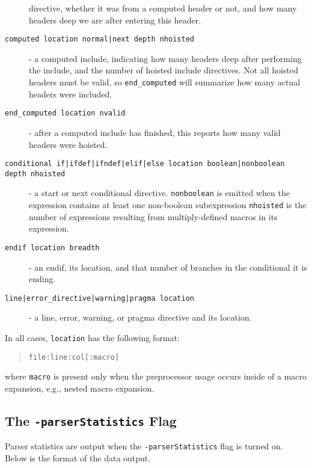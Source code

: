 \documentclass{article}
\begin{document}
\begin{description}
  directive, whether it was from a computed header or not, and how
  many headers deep we are after entering this header.
\item[\texttt{computed location normal|next depth nhoisted}] - a computed
  include, indicating how many headers deep after performing the
  include, and the number of hoisted include directives.  Not all
  hoisted headers must be valid, so \verb"end_computed" will summarize how
  many actual headers were included.
\item[\texttt{end\_computed location nvalid}] - after a computed include has
  finished, this reports how many valid headers were hoisted.
\item[\texttt{conditional if|ifdef|ifndef|elif|else location
  boolean|nonboolean depth nhoisted}] - a start or next conditional
  directive. \verb"nonboolean" is emitted when the expression contains at
  least one non-boolean subexpression \verb"nhoisted" is the number of
  expressions resulting from multiply-defined macros in its
  expression.
\item[\texttt{endif location breadth}] - an endif, its location, and that
  number of branches in the conditional it is ending.
\item[\texttt{line|error\_directive|warning|pragma location}] - a line, error, warning,
  or pragma directive and its location.
\end{description}

In all cases, \verb"location" has the following format:

\begin{quote}
\verb"file:line:col[:macro]"
\end{quote}

where \verb"macro" is present only when the preprocessor usage occurs
inside of a macro expansion, e.g., nested macro expansion.

\subsection{The \texttt{-parserStatistics} Flag}

Parser statistics are output when the \verb"-parserStatistics" flag is
turned on.  Below is the format of the data output.
\end{document}
